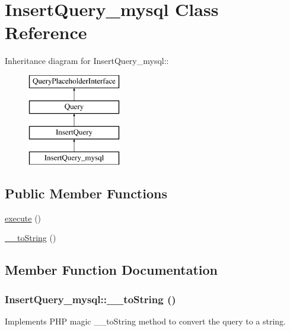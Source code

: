 \hypertarget{classInsertQuery__mysql}{
\section{InsertQuery\_\-mysql Class Reference}
\label{classInsertQuery__mysql}
}
Inheritance diagram for InsertQuery\_\-mysql::\begin{figure}[H]
\begin{center}
\leavevmode
\includegraphics[height=4cm]{classInsertQuery__mysql}
\end{center}
\end{figure}
\subsection*{Public Member Functions}
\begin{DoxyCompactItemize}
\item 
\hyperlink{classInsertQuery__mysql_a52483727457029115fc127c562b47502}{execute} ()
\item 
\hyperlink{classInsertQuery__mysql_ab941db654e7813130a9147c74bff0b38}{\_\-\_\-toString} ()
\end{DoxyCompactItemize}


\subsection{Member Function Documentation}
\hypertarget{classInsertQuery__mysql_ab941db654e7813130a9147c74bff0b38}{
\subsubsection[{\_\-\_\-toString}]{\setlength{\rightskip}{0pt plus 5cm}InsertQuery\_\-mysql::\_\-\_\-toString ()}}
\label{classInsertQuery__mysql_ab941db654e7813130a9147c74bff0b38}
Implements PHP magic \_\-\_\-toString method to convert the query to a string.


